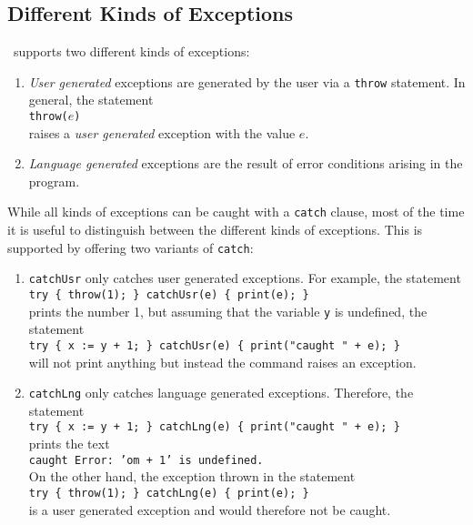 \subsection{Different Kinds of Exceptions}
\setlx\ supports two different kinds of exceptions:
\begin{enumerate}
\item \emph{User generated} exceptions are generated by the user via a \texttt{throw} statement.
      In general, the statement
      \\[0.2cm]
      \hspace*{1.3cm}
      \texttt{throw($e$)}
      \\[0.2cm]
      raises a \emph{user generated} exception with the value $e$.
\item \emph{Language generated} exceptions are the result of error conditions arising in
      the program. 
\end{enumerate}
While all kinds of exceptions can be caught with a \texttt{catch} clause, most of the time
it is useful to distinguish between the different kinds of exceptions.  This is supported
by offering two variants of \texttt{catch}:
\begin{enumerate}
\item \texttt{catchUsr} only catches user generated exceptions.  For example, the statement
      \\[0.2cm]
      \hspace*{1.3cm}
      \texttt{try \{ throw(1); \} catchUsr(e) \{ print(e); \}}
      \\[0.2cm]
      prints the number 1, but assuming that the variable \texttt{y} is undefined, the 
      statement 
      \\[0.2cm]
      \hspace*{1.3cm}
      \texttt{try \{ x := y + 1; \} catchUsr(e) \{ print("caught " + e); \}}
      \\[0.2cm]
      will not print anything but instead the command raises an exception.
\item \texttt{catchLng} only catches language generated exceptions.  Therefore, the statement
      \\[0.2cm]
      \hspace*{1.3cm}
      \texttt{try \{ x := y + 1; \} catchLng(e) \{ print("caught " + e); \}}
      \\[0.2cm]
      prints the text
      \\[0.2cm]
      \hspace*{1.3cm}
      \texttt{caught Error: 'om + 1' is undefined.}
      \\[0.2cm]
      On the other hand,  the exception thrown in the statement
      \\[0.2cm]
      \hspace*{1.3cm}
      \texttt{try \{ throw(1); \} catchLng(e) \{ print(e); \}}
      \\[0.2cm]
      is a user generated exception and would therefore not be caught.
\end{enumerate}
